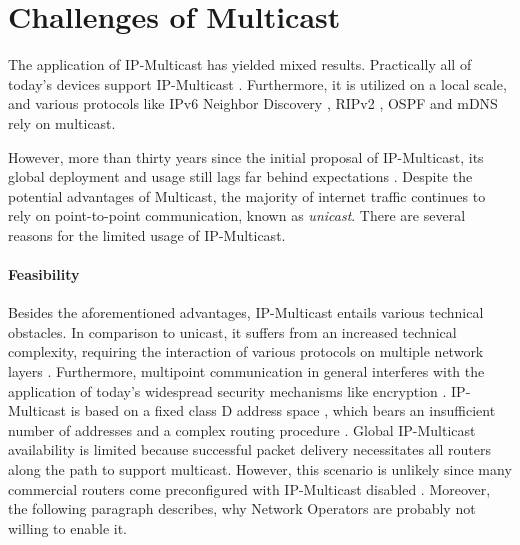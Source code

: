 \section{Challenges of Multicast} %
\label{sec:Challenges of Multicast}


The application of IP-Multicast has yielded mixed results.
Practically all of today's devices support IP-Multicast
    \cite{ratnasamy2006revisiting}.
Furthermore, it is utilized on a local scale, and various protocols like IPv6
    Neighbor Discovery \cite{rfc4861_ipv6_nd}, RIPv2 \cite{rfc2453_rip}, OSPF
    \cite{rfc2328_ospf} and mDNS \cite{rfc6762_mdns} rely on multicast.

However, more than thirty years since the initial proposal of IP-Multicast, its
    global deployment and usage still lags far behind expectations
    \cite{diot2000deployment, ratnasamy2006revisiting}.
Despite the potential advantages of Multicast, the majority of internet traffic
    continues to rely on point-to-point communication, known as
    \textit{unicast}.
There are several reasons for the limited usage of IP-Multicast.

\paragraph{Feasibility} %
\label{par:Feasibility}
Besides the aforementioned advantages, IP-Multicast entails various technical
    obstacles.
In comparison to unicast, it suffers from an increased technical complexity,
    requiring the interaction of various protocols on multiple network layers
    \cite{ratnasamy2006revisiting,diot2000deployment}.
Furthermore, multipoint communication in general interferes with the
    application of today's widespread security mechanisms like encryption
    \cite{rafaeli2003group_key_mgm}.
IP-Multicast is based on a fixed class D address space \cite{rfc1112_ipmc},
    which bears an insufficient number of addresses \cite{meadcast2} and a
    complex routing procedure
    \cite{diot2000deployment,ratnasamy2006revisiting}.
Global IP-Multicast availability is limited because successful packet delivery
    necessitates all routers along the path to support multicast.
However, this scenario is unlikely since many commercial routers come
    preconfigured with IP-Multicast disabled \cite{aruba_doc}.
Moreover, the following paragraph describes, why Network Operators are probably
    not willing to enable it.


